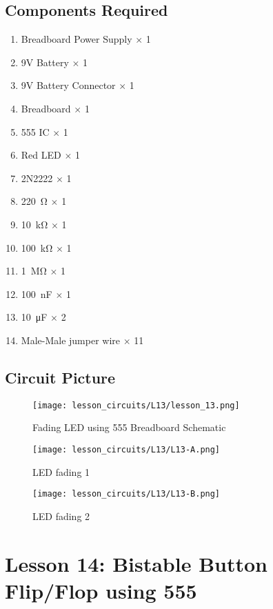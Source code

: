 \subsection{Components Required}
\begin{enumerate}
    \item Breadboard Power Supply $\times$ 1
    \item 9V Battery $\times$ 1
    \item 9V Battery Connector $\times$ 1
    \item Breadboard $\times$ 1
    \item 555 IC $\times$ 1
    \item Red LED $\times$ 1
    \item 2N2222 $\times$ 1
    \item \SI{220}{\ohm} $\times$ 1
    \item \SI{10}{\kilo\ohm} $\times$ 1
    \item \SI{100}{\kilo\ohm} $\times$ 1
    \item \SI{1}{\Mohm} $\times$ 1
    \item \SI{100}{\nano\farad} $\times$ 1
    \item \SI{10}{\micro\farad} $\times$ 2
    \item Male-Male jumper wire $\times$ 11
\end{enumerate}
\subsection{Circuit Picture}
\begin{figure}[!h]
    \centering
    \texttt{[image: lesson\_circuits/L13/lesson\_13.png]}
    \caption{Fading LED using 555 Breadboard Schematic}
    \label{fig:555_fled_sch}
\end{figure}
\begin{figure}[!h]
    \centering
    \texttt{[image: lesson\_circuits/L13/L13-A.png]}
    \caption{LED fading 1}
    \label{fig:555_fled_obb}
\end{figure}
\begin{figure}[!h]
    \centering
    \texttt{[image: lesson\_circuits/L13/L13-B.png]}
    \caption{LED fading 2}
    \label{fig:555_fled_obb1}
\end{figure}

\section{Lesson 14: Bistable Button Flip/Flop using 555}
